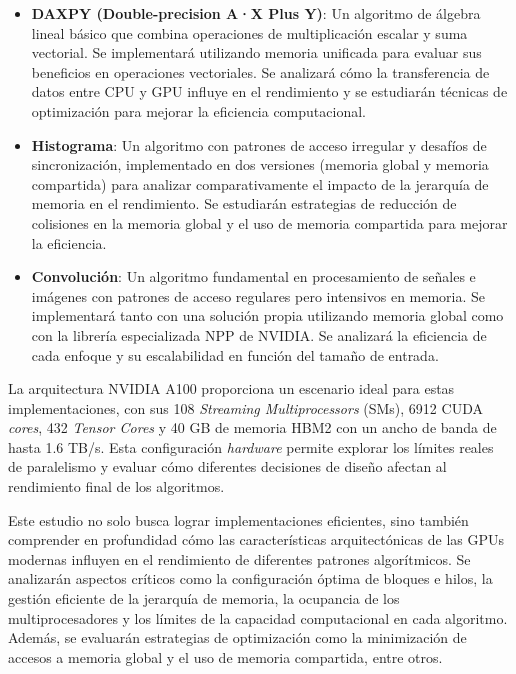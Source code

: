 \begin{itemize}

    \item \textbf{DAXPY (Double-precision A·X Plus Y)}: Un algoritmo de álgebra lineal básico que combina operaciones de multiplicación escalar y suma vectorial. Se implementará utilizando memoria unificada para evaluar sus beneficios en operaciones vectoriales. Se analizará cómo la transferencia de datos entre CPU y GPU influye en el rendimiento y se estudiarán técnicas de optimización para mejorar la eficiencia computacional.

    \item \textbf{Histograma}: Un algoritmo con patrones de acceso irregular y desafíos de sincronización, implementado en dos versiones (memoria global y memoria compartida) para analizar comparativamente el impacto de la jerarquía de memoria en el rendimiento. Se estudiarán estrategias de reducción de colisiones en la memoria global y el uso de memoria compartida para mejorar la eficiencia.

    \item \textbf{Convolución}: Un algoritmo fundamental en procesamiento de señales e imágenes con patrones de acceso regulares pero intensivos en memoria. Se implementará tanto con una solución propia utilizando memoria global como con la librería especializada NPP de NVIDIA. Se analizará la eficiencia de cada enfoque y su escalabilidad en función del tamaño de entrada.

\end{itemize}

La arquitectura NVIDIA A100 proporciona un escenario ideal para estas implementaciones, con sus 108 \textit{Streaming Multiprocessors} (SMs), 6912 CUDA \textit{cores}, 432 \textit{Tensor Cores} y 40 GB de memoria HBM2 con un ancho de banda de hasta 1.6 TB/s. Esta configuración \textit{hardware} permite explorar los límites reales de paralelismo y evaluar cómo diferentes decisiones de diseño afectan al rendimiento final de los algoritmos.

Este estudio no solo busca lograr implementaciones eficientes, sino también comprender en profundidad cómo las características arquitectónicas de las GPUs modernas influyen en el rendimiento de diferentes patrones algorítmicos. Se analizarán aspectos críticos como la configuración óptima de bloques e hilos, la gestión eficiente de la jerarquía de memoria, la ocupancia de los multiprocesadores y los límites de la capacidad computacional en cada algoritmo. Además, se evaluarán estrategias de optimización como la minimización de accesos a memoria global y el uso de memoria compartida, entre otros.

